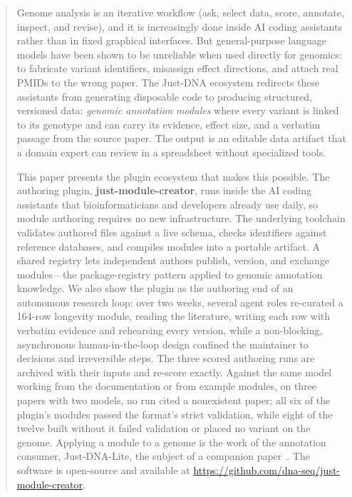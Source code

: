 \documentclass[11pt,a4paper]{article}
\begin{document}
\maketitle

\begin{abstract}
Genome analysis is an iterative workflow (ask, select data, score, annotate,
inspect, and revise), and it is increasingly done inside AI coding assistants
rather than in fixed graphical interfaces. But general-purpose language models have been shown to be
unreliable when used directly for genomics: to fabricate variant identifiers,
misassign effect directions, and attach real PMIDs to the wrong paper. The
Just-DNA ecosystem redirects these assistants from generating disposable code to
producing structured, versioned data: \emph{genomic annotation modules} where
every variant is linked to its genotype and can carry its evidence, effect
size, and a verbatim passage from the source paper. The output is an editable data artifact that a domain
expert can review in a spreadsheet without specialized tools.

This paper presents the plugin ecosystem that makes this possible. The
authoring plugin, \textbf{just-module-creator}, runs inside the AI coding
assistants that bioinformaticians and developers already use daily, so module
authoring requires no new infrastructure. The underlying toolchain validates
authored files against a live schema, checks identifiers against reference
databases, and compiles modules into a portable artifact. A shared registry lets
independent authors publish, version, and exchange modules---the package-registry
pattern applied to genomic annotation knowledge. We also show the plugin as the
authoring end of an autonomous research loop: over two weeks, several agent
roles re-curated a 164-row longevity module, reading the literature, writing
each row with verbatim evidence and rehearsing every version, while a
non-blocking, asynchronous human-in-the-loop design confined the maintainer to
decisions and irreversible steps. The three scored authoring runs are archived
with their inputs and re-score exactly. Against the same model working from
the documentation or from example modules, on three papers with two models, no
run cited a nonexistent paper; all six of the plugin's modules passed the
format's strict validation, while eight of the twelve built without it failed
validation or placed no variant on the genome. Applying a module to a genome is the
work of the annotation consumer, Just-DNA-Lite, the subject of a companion
paper~\citep{companion2026justdnalite}. The software is open-source and available at
\url{https://github.com/dna-seq/just-module-creator}.
\end{abstract}
\end{document}
